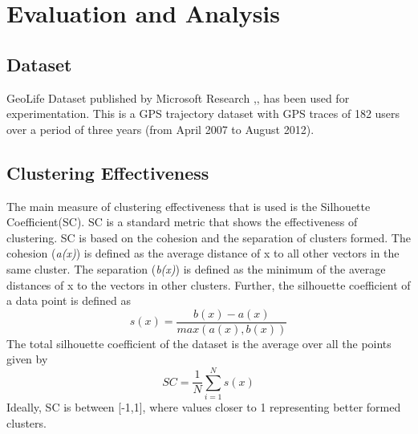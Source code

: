 \section{Evaluation and Analysis}

\subsection{Dataset}
GeoLife Dataset published by Microsoft Research \cite{geolife1},\cite{geolife2},\cite{geolife3} has been used for experimentation. This is a GPS trajectory dataset with GPS traces of 182 users over a period of three years (from April 2007 to August 2012). 
\subsection{Clustering Effectiveness}
The main measure of clustering effectiveness that is used is the Silhouette Coefficient(SC). SC is a standard metric that shows the effectiveness of clustering. SC is based on the cohesion and the separation of clusters formed. The cohesion (\textit{a(x)})  is defined as the average distance of x to all other vectors in the same cluster. 
The separation (\textit{b(x)}) is defined as the minimum of the average distances of x to the vectors in other clusters.
Further, the silhouette coefficient of a data point is defined as 
\begin{equation}
s(x)=\frac{b(x)-a(x)}{max(a(x),b(x))}
\end{equation}
The total silhouette coefficient of the dataset is the average over all the points given by
\begin{equation}
SC=\frac{1}{N}\sum_{i=1}^{N}s(x)
\end{equation}
\noindent Ideally, SC is between [-1,1], where values closer to 1 representing better formed clusters. 


